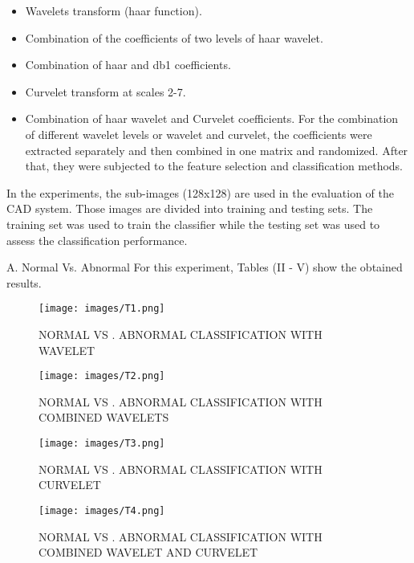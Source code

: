 \documentclass[hidelinks,12pt]{article}
\begin{document}
\begin{itemize}
\item Wavelets transform (haar function).
\item Combination of the coefficients of two levels of haar
wavelet.
\item Combination of haar and db1 coefficients.
\item Curvelet transform at scales 2-7.
\item Combination of haar wavelet and Curvelet coefficients.
For the combination of different wavelet levels or wavelet
and curvelet, the coefficients were extracted separately and
then combined in one matrix and randomized. After that,
they were subjected to the feature selection and
classification methods.
\end{itemize}

In the experiments, the sub-images (128x128) are used in
the evaluation of the CAD system. Those images are divided
into training and testing sets. The training set was used to
train the classifier while the testing set was used to assess the
classification performance.

A. Normal Vs. Abnormal
For this experiment, Tables (II - V) show the obtained
results.

\newpage
\begin{figure}[h]
      \texttt{[image: images/T1.png]}
      \centering
      \label{fig:13}
      \caption{NORMAL VS . ABNORMAL CLASSIFICATION WITH WAVELET}
\end{figure} 


\begin{figure}[h]
      \texttt{[image: images/T2.png]}
      \centering
      \label{fig:14}
      \caption{NORMAL VS . ABNORMAL CLASSIFICATION WITH
COMBINED WAVELETS}
\end{figure} 


\begin{figure}[h]
      \texttt{[image: images/T3.png]}
      \centering
      \label{fig:15}
      \caption{NORMAL VS . ABNORMAL CLASSIFICATION WITH
CURVELET}
\end{figure} 

\newpage

\begin{figure}[h]
      \texttt{[image: images/T4.png]}
      \centering
      \label{fig:16}
      \caption{NORMAL VS . ABNORMAL CLASSIFICATION WITH
COMBINED WAVELET AND CURVELET}
\end{figure}
\end{document}
